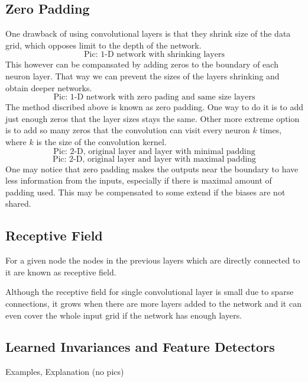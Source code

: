 \documentclass[]{article}
\begin{document}
\subsection{Zero Padding}
One drawback of using convolutional layers is that they shrink size of the data
grid, which opposes limit to the depth of the network.
\[
\text{Pic: 1-D network with shrinking layers}
\]
This however can be compansated by
adding zeros to the boundary of each neuron layer. That way we can prevent the
sizes of the layers shrinking and obtain deeper networks.
\[
\text{Pic: 1-D network with zero pading and same size layers}
\]
The method discribed above is known as zero padding. One way to do it is to add
just enough zeros that the layer sizes stays the same. Other more extreme option
is to add so many zeros that the convolution can visit every neuron $k$ times,
where $k$ is the size of the convolution kernel.
\[
\text{Pic: 2-D, original layer and layer with minimal padding}
\]
\[
\text{Pic: 2-D, original layer and layer with maximal padding}
\]
One may notice that zero padding makes the outputs near the boundary to have less
information from the inputs, especially if there is maximal amount of padding
used. This may be compensated to some extend if the biases are not shared.

\subsection{Receptive Field}
For a given node the nodes in the previous layers which are directly connected
to it are known as receptive field.

Although the receptive field for single convolutional layer is small due to sparse
connections, it grows when there are more layers added to the network and it can
even cover the whole input grid if the network has enough layers.


\subsection{Learned Invariances and Feature Detectors}
Examples, Explanation (no pics)
\end{document}
